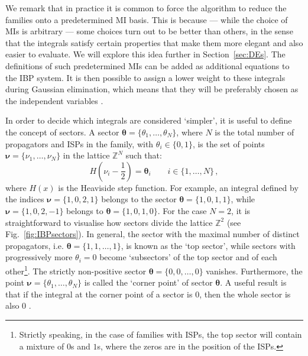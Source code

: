 \documentclass[main.tex]{subfiles}
\begin{document}
We remark that in practice it is common to force the algorithm to reduce the families onto a predetermined MI basis. This is because --- while the choice of MIs is arbitrary --- some choices turn out to be better than others, in the sense that the integrals satisfy certain properties that make them more elegant and also easier to evaluate. We will explore this idea further in Section~\ref{sec:DEs}. The definitions of such predetermined MIs can be added as additional equations to the IBP system. It is then possible to assign a lower weight to these integrals during Gaussian elimination, which means that they will be preferably chosen as the independent variables \cite{Peraro:2019svx}.

In order to decide which integrals are considered `simpler', it is useful to define the concept of sectors. A sector $\bm{\theta} = \{\theta_1, \ldots, \theta_N\}$, where $N$ is the total number of propagators and ISPs in the family, with $\theta_i\in \{0, 1\}$, is the set of points $\bm{\nu} = \{\nu_1, \ldots, \nu_N\}$ in the lattice $\mathbb{Z}^N$ such that:
\begin{equation} \label{eq:sectors}
    H \left(\nu_i - \frac{1}{2} \right) = \mathbf{\theta}_i \qquad i \in \{1, \ldots, N\} \,,
\end{equation}
where $H(x)$ is the Heaviside step function. For example, an integral defined by the indices $\bm{\nu} = \{1, 0, 2, 1\}$ belongs to the sector $\bm{\theta} = \{1, 0, 1, 1\}$, while $\bm{\nu} = \{1, 0, 2, -1\}$ belongs to $\bm{\theta} = \{1, 0, 1, 0\}$. For the case $N=2$, it is straightforward to visualise how sectors divide the lattice $\mathbb{Z}^2$ (see Fig.~\ref{fig:IBPsectors}). In general, the sector with the maximal number of distinct propagators, i.e. $\bm{\theta} = \{1, 1, \ldots, 1\}$, is known as the `top sector', while sectors with progressively more $\theta_i = 0$ become `subsectors' of the top sector and of each other\footnote{Strictly speaking, in the case of families with ISPs, the top sector will contain a mixture of $0$s and $1$s, where the zeros are in the position of the ISPs.}. The strictly non-positive sector $\bm{\theta} = \{0, 0, \ldots, 0\}$ vanishes. Furthermore, the point $\bm{\nu} = \{\theta_1, \ldots, \theta_N\}$ is called the `corner point' of sector $\bm{\theta}$. A useful result is that if the integral at the corner point of a sector is 0, then the whole sector is also 0 \cite{Lee:2008tj}.
\end{document}
